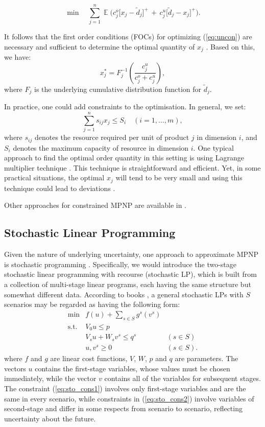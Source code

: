 \documentclass[a4paper,11pt]{article}
\begin{document}
\begin{equation}
    \min \quad \sum_{j=1}^n \mathop{\mathbb{E}} \big( c^o_j \big[  x_j - {\tilde d}_j \big]^+ \, + \, c^u_j \big[ {\tilde d}_j - x_j \big]^+ \big).
\label{eq:uncon}
\end{equation}

It follows that the first order conditions (FOCs) for optimizing (\ref{eq:uncon}) are
necessary and sufficient to determine the optimal quantity of $x_j$ \cite{Ch12}. Based on this, we have:
\[
    x_j^* = F_j^{-1}\left( \frac{c_j^u}{c_j^o+c_j^u} \right),
\]
where $F_j$ is the underlying cumulative distribution function for ${\tilde d}_j$.

In practice, one could add constraints to the optimisation. In general, we set:
\[
    \sum_{j=1}^n s_{ij} x_j \le S_i	\quad (i = 1, \ldots, m),
\]
where $s_{ij}$ denotes the resource required per unit of product $j$ in dimension $i$, and $S_i$ denotes the maximum capacity of resource in dimension $i$. One typical approach to find the optimal order quantity in this setting is using Lagrange multiplier technique  \cite{HW63,LL95}. This technique is straightforward and efficient. Yet, in some practical situations, the optimal $x_j$ will tend to be very small and using this technique could lead to deviations \cite{HW63}. 

Other approaches for constrained MPNP are available in \cite{ALM05,BR93,NS84,ZXH09,Zh10}.


\subsection{Stochastic Linear Programming}
Given the nature of underlying uncertainty, one approach to approximate MPNP is stochastic programming \cite{Bea55,D98}. Specifically, we would introduce the two-stage stochastic linear programming with recourse (stochastic LP), which is built from a collection of multi-stage linear programs, each having the same structure but somewhat different data. According to books \cite{HS13,KM76,KWK94,Pf12}, a general stochastic LPs with $S$ scenarios may be regarded as having the following form:
\begin{eqnarray}
    \min	& f ( u ) + \sum_{s \in S} g^s ( v^s )\\
\label{eq:sto_cons1}
	\text{s.t.}    & V_0 u \leq p\\
\label{eq:sto_cons2}
	& V_s u +W_s v^s \leq q^s & (s \in S)\\
	& u, v^s \geq 0 & (s \in S).
\end{eqnarray}
where $f$ and $g$ are linear cost functions, $V$, $W$, $p$ and $q$ are parameters. The vectors $u$ contains the first-stage variables, whose values must be chosen immediately, while the vector $v$ contains all of the variables for subsequent stages. The constraint (\ref{eq:sto_cons1}) involves only first-stage variables and are the same in every scenario, while constraints in (\ref{eq:sto_cons2}) involve variables of second-stage and differ in some respects from scenario to scenario, reflecting uncertainty about the future.
\end{document}
